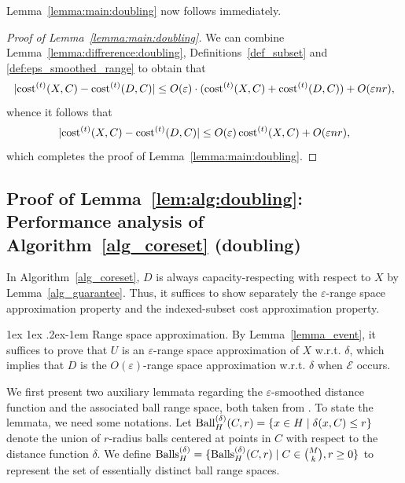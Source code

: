 \documentclass[11pt,letterpaper]{article}
\makeatletter
\renewcommand{\paragraph}{%
  \@startsection{paragraph}{4}%
  {\z@}{1ex \@plus 1ex \@minus .2ex}{-1em}%
  {\normalfont\normalsize\bfseries}%
}
\theoremstyle{definition}
\newcommand{\eps}{\varepsilon}
\DeclarePairedDelimiter{\abs}{\lvert}{\rvert}
\makeatother
\begin{document}
Lemma~\ref{lemma:main:doubling} now follows immediately.
\begin{proof}[Proof of Lemma~\ref{lemma:main:doubling}]
    We can combine Lemma~\ref{lemma:diffrerence:doubling}, Definitions~\ref{def_subset} and \ref{def:eps_smoothed_range} to obtain that
    \[
	    \abs{ \cost[t](X,C)-\cost[t](D,C)} \leq O(\eps)\cdot (\cost[t](X,C)+\cost[t](D,C))+O(\eps nr),
    \]
    whence it follows that
    \[
	    \abs{ \cost[t](X,C)-\cost[t](D,C)} \leq O(\eps)\cost[t](X,C) + O(\eps nr),
    \]
    which completes the proof of Lemma~\ref{lemma:main:doubling}.
\end{proof}

\subsection{Proof of Lemma~\ref{lem:alg:doubling}: Performance analysis of Algorithm~\ref{alg_coreset} (doubling)}
\label{sec:lemma_main:range:doubling}


In Algorithm~\ref{alg_coreset}, $D$ is always capacity-respecting with respect to $X$ by Lemma~\ref{alg_guarantee}. Thus, it suffices to show separately the $\eps$-range space approximation property and the indexed-subset cost approximation property.

\paragraph{Range space approximation.}
By Lemma~\ref{lemma_event}, it suffices to prove that $U$ is an $\eps$-range space approximation of $X$ w.r.t. $\delta$, which implies that $D$ is the $O(\eps)$-range space approximation w.r.t. $\delta$ when $\mathcal{E}$ occurs.

We first present two auxiliary lemmata regarding the $\eps$-smoothed distance function and the associated ball range space, both taken from \cite{huang2018epsilon}. To state the lemmata, we need some notations. Let $\Ballh[\delta](C,r)=\{ x\in H \mid \delta(x,C)\leq r  \}$ denote the union of $r$-radius balls centered at points in $C$ with respect to the distance function $\delta$. We define $\Ballsh[\delta]=\{\Ballsh[\delta](C,r) \mid C\in \binom{M}{k},r\geq 0\} $ to represent the set of essentially distinct ball range spaces. 
\end{document}
